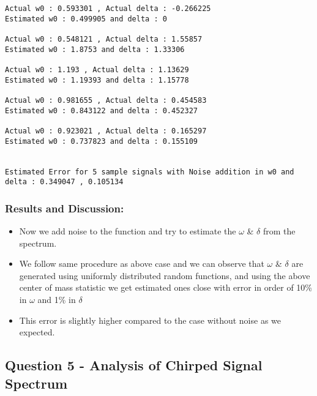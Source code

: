 \documentclass[10pt,a4paper]{article}
\providecommand{\tightlist}{%
      \setlength{\itemsep}{0pt}\setlength{\parskip}{0pt}}
\begin{document}
	

	

    \begin{Verbatim}[commandchars=\\\{\}]
Actual w0 : 0.593301 , Actual delta : -0.266225
Estimated w0 : 0.499905 and delta : 0 

Actual w0 : 0.548121 , Actual delta : 1.55857
Estimated w0 : 1.8753 and delta : 1.33306 

Actual w0 : 1.193 , Actual delta : 1.13629
Estimated w0 : 1.19393 and delta : 1.15778 

Actual w0 : 0.981655 , Actual delta : 0.454583
Estimated w0 : 0.843122 and delta : 0.452327 

Actual w0 : 0.923021 , Actual delta : 0.165297
Estimated w0 : 0.737823 and delta : 0.155109 


Estimated Error for 5 sample signals with Noise addition in w0 and delta : 0.349047 , 0.105134

    \end{Verbatim}

	
		
    \subsubsection{Results and Discussion:}\label{results-and-discussion}

\begin{itemize}
\tightlist
\item
  Now we add noise to the function and try to estimate the \(\omega\) \&
  \(\delta\) from the spectrum.
\item
  We follow same procedure as above case and we can observe that
  \(\omega\) \& \(\delta\) are generated using uniformly distributed
  random functions, and using the above center of mass statistic we get
  estimated ones close with error in order of 10\% in \(\omega\) and 1\%
  in \(\delta\)
\item
  This error is slightly higher compared to the case without noise as we
  expected.
\end{itemize}

	

	
		
    \subsection{Question 5 - Analysis of Chirped Signal
Spectrum}\label{question-5---analysis-of-chirped-signal-spectrum}
\end{document}
